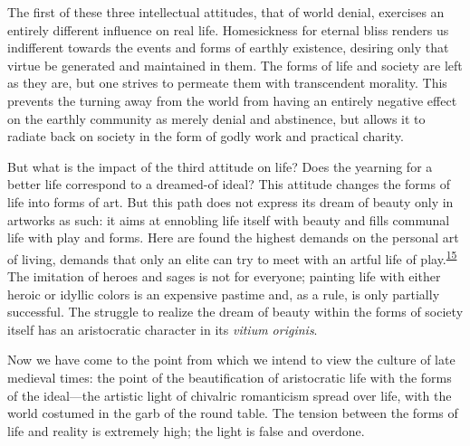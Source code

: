 The first of these three intellectual attitudes, that of world denial,
exercises an entirely different influence on real life. Homesickness
\protect\hypertarget{09_Chapter_Two__THE_CRAVING_FOR_A_M.xhtmlux5cux23page_39}{}{}for
eternal bliss renders us indifferent towards the events and forms of
earthly existence, desiring only that virtue be generated and maintained
in them. The forms of life and society are left as they are, but one
strives to permeate them with transcendent morality. This prevents the
turning away from the world from having an entirely negative effect on
the earthly community as merely denial and abstinence, but allows it to
radiate back on society in the form of godly work and practical charity.

But what is the impact of the third attitude on life? Does the yearning
for a better life correspond to a dreamed-of ideal? This attitude
changes the forms of life into forms of art. But this path does not
express its dream of beauty only in artworks as such: it aims at
ennobling life itself with beauty and fills communal life with play and
forms. Here are found the highest demands on the personal art of living,
demands that only an elite can try to meet with an artful life of
play.\textsuperscript{\protect\hypertarget{09_Chapter_Two__THE_CRAVING_FOR_A_M.xhtmlux5cux23id_2057}{\protect\hyperlink{23_NOTES.xhtmlux5cux23id_2058}{15}}}
The imitation of heroes and sages is not for everyone; painting life
with either heroic or idyllic colors is an expensive pastime and, as a
rule, is only partially successful. The struggle to realize the dream of
beauty within the forms of society itself has an aristocratic character
in its \emph{vitium originis}.

Now we have come to the point from which we intend to view the culture
of late medieval times: the point of the beautification of aristocratic
life with the forms of the ideal---the artistic light of chivalric
romanticism spread over life, with the world costumed in the garb of the
round table. The tension between the forms of life and reality is
extremely high; the light is false and overdone.

